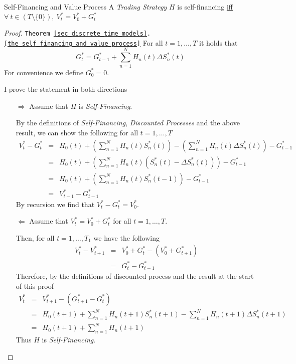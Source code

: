 \documentclass[11pt,a4paper]{article}
\begin{document}
  \begin{theorem}{Self-Financing and Value Process}\label{the_self_financing_and_value_process}
    A \textit{Trading Strategy} $H$ is self-financing \underline{iff} $\forall\ t\in(T\setminus\{0\}),\ V_t^*=V_0^*+G_t^*$
  \end{theorem}

  \begin{proof}{\texttt{Theorem \ref{sec_discrete_time_models}.\ref{the_self_financing_and_value_process}}}\label{proof_self_financing_and_value_process}
    For all $t=1,\dots,T$ it holds that
    \[ G_t^*=G_{t-1}^*+\sum_{n=1}^NH_n(t)\Delta S_n^*(t) \]
    For convenience we define $G_0^*=0$.
    \par I prove the statement in both directions
    \begin{itemize}
      \item[$\Longrightarrow$] Assume that $H$ is \textit{Self-Financing}.
      \par By the definitions of \textit{Self-Financing}, \textit{Discounted Processes} and the above result, we can show the following for all $t=1,\dots,T$
      \[\begin{array}{rcl}
        V_t^*-G_t^*&=&H_0(t)+\left(\sum_{n=1}^NH_n(t)S_n^*(t)\right)-\left(\sum_{n=1}^NH_n(t)\Delta S_n^*(t)\right)-G_{t-1}^*\\
        &=&H_0(t)+\left(\sum_{n=1}^NH_n(t)(S_n^*(t)-\Delta S_n^*(t))\right)-G_{t-1}^*\\
        &=&H_0(t)+\left(\sum_{n=1}^NH_n(t)S_n^*(t-1)\right)-G_{t-1}^*\\
        &=&V_{t-1}^*-G_{t-1}^*
      \end{array}\]
      By recursion we find that $V_t^*-G_t^*=V_0^*$.

      \item[$\Longleftarrow$] Assume that $V_t^*=V_0^*+G_t^*$ for all $t=1,\dots,T$.
      \par Then, for all $t=1,\dots,T_1$ we have the following
      \[\begin{array}{rcl}
        V_t^*-V_{t+1}^*&=&V_0^*+G_t^*-(V_0^*+G_{t+1}^*)\\
        &=&G_t^*-G_{t-1}^*
      \end{array}\]
      Therefore, by the definitions of discounted process and the result at the start of this proof
      \[\begin{array}{rcl}
        V_t^*&=&V_{t+1}^*-(G_{t+1}^*-G_t^*)\\
        &=&H_0(t+1)+\sum_{n=1}^NH_n(t+1)S_n^*(t+1)-\sum_{n=1}^NH_n(t+1)\Delta S_n^*(t+1)\\
        &=&H_0(t+1)+\sum_{n=1}^NH_n(t+1)
      \end{array}\]
      Thus $H$ is \textit{Self-Financing}.
    \end{itemize}
    \proved
  \end{proof}
\end{document}
